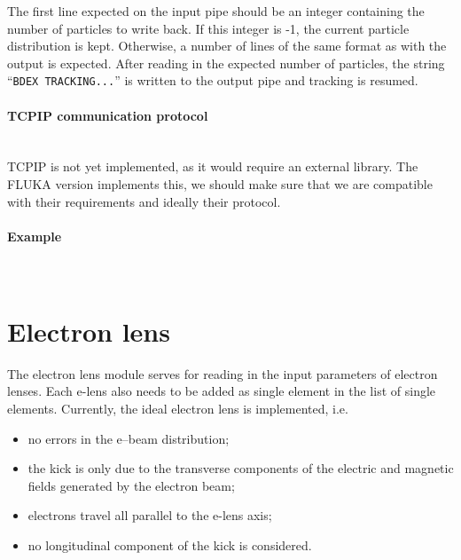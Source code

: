The first line expected on the input pipe should be an integer containing the number of particles to write back.
If this integer is -1, the current particle distribution is kept.
Otherwise, a number of lines of the same format as with the output is expected.
After reading in the expected number of particles, the string ``\texttt{BDEX TRACKING...}'' is written to the output pipe and tracking is resumed.

\paragraph{TCPIP communication protocol}~\\

TCPIP is not yet implemented, as it would require an external library.
The FLUKA version implements this, we should make sure that we are compatible with their requirements and ideally their protocol.

\paragraph{Example}~\\


\section{Electron lens} \label{sec:elen}

The electron lens module serves for reading in the input parameters of electron lenses.
Each e-lens also needs to be added as single element in the list of single elements.
Currently, the ideal electron lens is implemented, i.e.
\begin{itemize}
\item no errors in the e--beam distribution;
\item the kick is only due to the transverse components of the electric and
  magnetic fields generated by the electron beam;
\item electrons travel all parallel to the e-lens axis;
\item no longitudinal component of the kick is considered.
\end{itemize}

